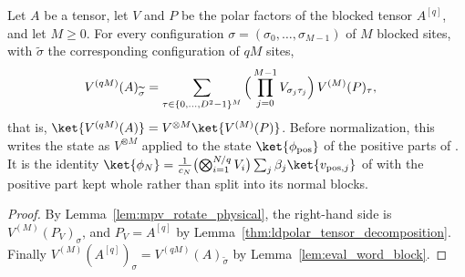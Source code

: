 \begin{lemma}
    \label{thm:ldpolar_blocked_state}
    \leanok
    Let $A$ be a tensor, let $V$ and $P$ be the polar factors of the blocked
    tensor $A^{[q]}$, and let $M\ge 0$. For every configuration
    $\sigma=(\sigma_0,\dots,\sigma_{M-1})$ of $M$ blocked sites, with
    $\widetilde\sigma$ the corresponding configuration of $qM$ sites,
    \begin{align}
        V^{(qM)}(A)_{\widetilde\sigma}
         & =\sum_{\tau\in\{0,\dots,D^2-1\}^M}
        \Big(\prod_{j=0}^{M-1}V_{\sigma_j\tau_j}\Big)\,V^{(M)}(P)_\tau,
        \notag
    \end{align}
    that is, $\ket{V^{(qM)}(A)}=V^{\otimes M}\ket{V^{(M)}(P)}$. Before
    normalization, this writes the state as $V^{\otimes M}$ applied to the
    state $\ket{\phi_{\mathrm{pos}}}$ of the positive parts of
    \cite[eq.~(18)]{Malz2024Preparation}. It is the identity
    $\ket{\phi_N}=\frac{1}{c_N}\bigl(\bigotimes_{i=1}^{N/q}V_i\bigr)
        \sum_j\beta_j\ket{v_{\mathrm{pos},j}}$ of
    \cite[Supplemental Material]{Malz2024Preparation} with the positive part
    kept whole rather than split into its normal blocks.
\end{lemma}
\begin{proof}
    \leanok
    By Lemma~\ref{lem:mpv_rotate_physical}, the right-hand side is
    $V^{(M)}(P_V)_\sigma$, and $P_V=A^{[q]}$ by
    Lemma~\ref{thm:ldpolar_tensor_decomposition}. Finally
    $V^{(M)}(A^{[q]})_\sigma=V^{(qM)}(A)_{\widetilde\sigma}$ by
    Lemma~\ref{lem:eval_word_block}.
\end{proof}
